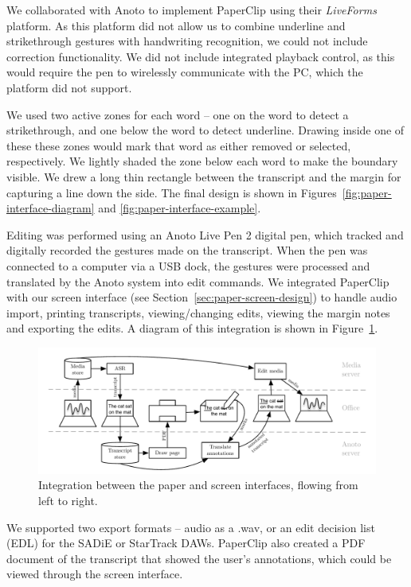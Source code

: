 We collaborated with Anoto to implement PaperClip using their \textit{Live\texttrademark Forms} platform. As this
platform did not allow us to combine underline and strikethrough gestures with handwriting recognition, we could not
include correction functionality.  We did not include integrated playback control, as this would require the pen to
wirelessly communicate with the PC, which the platform did not support.

We used two active zones for each word -- one on the word to detect a strikethrough, and one below the word to detect
underline. Drawing inside one of these these zones would mark that word as either removed or selected, respectively.
We lightly shaded the zone below each word to make the boundary visible.
We drew a long thin rectangle between the transcript and the margin for capturing a line down the side. The final
design is shown in Figures~\ref{fig:paper-interface-diagram} and \ref{fig:paper-interface-example}.

Editing was performed using an Anoto Live Pen 2 digital pen, which tracked and digitally recorded the gestures made on
the transcript.  When the pen was connected to a computer via a USB dock, the gestures were processed and translated by
the Anoto system into edit commands.  We integrated PaperClip with our screen interface (see
Section~\ref{sec:paper-screen-design}) to handle audio import, printing transcripts, viewing/changing edits, viewing
the margin notes and exporting the edits.  A diagram of this integration is shown in
Figure~\ref{fig:paper-screen-integration}.

\begin{figure}[h]
  \centering
  \includegraphics[width=\columnwidth]{figs/uist-sys-diagram}
  \caption{Integration between the paper and screen interfaces, flowing from left to right.}
  \label{fig:paper-screen-integration}
\end{figure}

We supported two export formats -- audio as a .wav, or an edit decision list (EDL) for the SADiE or StarTrack DAWs.
PaperClip also created a PDF document of the transcript that showed the user's annotations, which
could be viewed through the screen interface.

